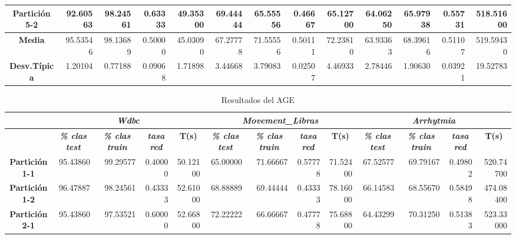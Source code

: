 \documentclass[a4paper,11pt]{article}
\begin{document}
\begin{table}[H]
\begin{adjustbox}{width=1.1\textwidth}
\begin{tabular}{|c|r|r|r|r|r|r|r|r|r|r|r|r|}
  \textbf{Partición 5-2} & 92.60563 & 98.24561 & 0.63333 & 49.35300 & 69.44444 & 65.55556 & 0.46667 & 65.12700 & 64.06250 & 65.97938 & 0.55731 & 518.51600 \\ \hline
  \textbf{Media} & 95.53546 & 98.13689 & 0.50000 & 45.03090 & 67.27778 & 71.55556 & 0.50111 & 72.23810 & 63.93363 & 68.39616 & 0.51107 & 519.59430 \\ \hline
  \textbf{Desv.Típica} & 1.20104 & 0.77188 & 0.09068 & 1.71898 & 3.44668 & 3.79083 & 0.02507 & 4.46933 & 2.78446 & 1.90630 & 0.03921 & 19.52783 \\ \hline
  \end{tabular}
  \end{adjustbox}
  \label{AGG}
  \end{table}
  
  \begin{table}[H]	
  \caption{Resultados del AGE}
  \begin{adjustbox}{width=1.1\textwidth}
  \begin{tabular}{|c|r|r|r|r|r|r|r|r|r|r|r|r|}
  \hline
  \multicolumn{1}{|l|}{} & \multicolumn{ 4}{c|}{\textbf{\textit{Wdbc}}} & \multicolumn{ 4}{c|}{\textbf{\textit{Movement\_Libras}}} & \multicolumn{ 4}{c|}{\textbf{\textit{Arrhytmia}}} \\ \hline
  \multicolumn{1}{|l|}{} & \multicolumn{1}{c|}{\textbf{\textit{\% clas test}}} & \multicolumn{1}{c|}{\textbf{\textit{\% clas train}}} & \multicolumn{1}{c|}{\textbf{\textit{tasa red}}} & \multicolumn{1}{c|}{\textbf{T(s)}} & \multicolumn{1}{c|}{\textbf{\textit{\% clas test}}} & \multicolumn{1}{c|}{\textbf{\textit{\% clas train}}} & \multicolumn{1}{c|}{\textbf{\textit{tasa red}}} & \multicolumn{1}{c|}{\textbf{T(s)}} & \multicolumn{1}{c|}{\textbf{\textit{\% clas test}}} & \multicolumn{1}{c|}{\textbf{\textit{\% clas train}}} & \multicolumn{1}{c|}{\textbf{\textit{tasa red}}} & \multicolumn{1}{c|}{\textbf{T(s)}} \\ \hline
  \textbf{Partición 1-1} & 95.43860 & 99.29577 & 0.40000 & 50.12100 & 65.00000 & 71.66667 & 0.57778 & 71.52400 & 67.52577 & 69.79167 & 0.49802 & 520.74700 \\ \hline
  \textbf{Partición 1-2} & 96.47887 & 98.24561 & 0.43333 & 52.61000 & 68.88889 & 69.44444 & 0.43333 & 78.16000 & 66.14583 & 68.55670 & 0.58498 & 474.08400 \\ \hline
  \textbf{Partición 2-1} & 95.43860 & 97.53521 & 0.60000 & 52.66800 & 72.22222 & 66.66667 & 0.47778 & 75.68800 & 64.43299 & 70.31250 & 0.51383 & 523.33000 \\ \hline

\end{tabular}
\end{adjustbox}
\end{table}
\end{document}
